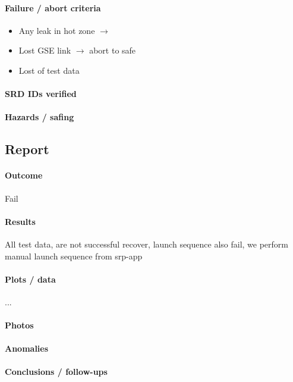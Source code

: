 \paragraph{Failure / abort criteria}
\begin{itemize}
  \item Any leak in hot zone $\rightarrow$
  \item Lost GSE link $\rightarrow$ abort to safe
  \item Lost of test data
\end{itemize}

\paragraph{SRD IDs verified}

\paragraph{Hazards / safing}

\subsection*{Report}

\paragraph{Outcome}
Fail

\paragraph{Results}
All test data, are not successful recover, launch sequence also fail, we perform manual launch sequence from srp-app

\paragraph{Plots / data}
...
\paragraph{Photos}

\paragraph{Anomalies}

\paragraph{Conclusions / follow-ups}
